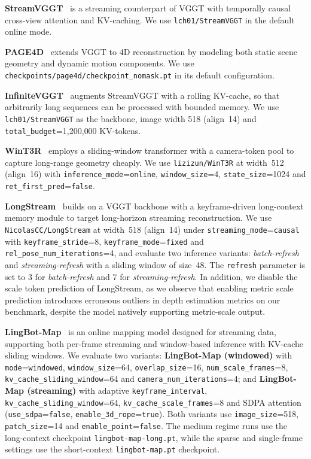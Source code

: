\textbf{StreamVGGT}~\citep{streamVGGT} is a streaming counterpart of VGGT with temporally causal cross-view attention and KV-caching.
%
We use \texttt{lch01/StreamVGGT} in the default online mode.

\textbf{PAGE4D}~\citep{zhou2025page4d} extends VGGT to 4D reconstruction by modeling both static scene geometry and dynamic motion components.
%
We use \texttt{checkpoints/page4d/checkpoint\_nomask.pt} in its default configuration.

\textbf{InfiniteVGGT}~\citep{yuan2026infinitevggt} augments StreamVGGT with a rolling KV-cache, so that arbitrarily long sequences can be processed with bounded memory.
%
We use \texttt{lch01/StreamVGGT} as the backbone, image width 518 (align~14) and \texttt{total\_budget}=1{,}200{,}000 KV-tokens.

\textbf{WinT3R}~\citep{li2025wint3r} employs a sliding-window transformer with a camera-token pool to capture long-range geometry cheaply.
%
We use \texttt{lizizun/WinT3R} at width~512 (align~16) with \texttt{inference\_mode}=\texttt{online}, \texttt{window\_size}=4, \texttt{state\_size}=1024 and \texttt{ret\_first\_pred}=\texttt{false}.

\textbf{LongStream}~\citep{cheng2026longstream} builds on a VGGT backbone with a keyframe-driven long-context memory module to target long-horizon streaming reconstruction.
%
We use \texttt{NicolasCC/LongStream} at width~518 (align~14) under \texttt{streaming\_mode}=\texttt{causal} with \texttt{keyframe\_stride}=8, \texttt{keyframe\_mode}=\texttt{fixed} and \texttt{rel\_pose\_num\_iterations}=4, and evaluate two inference variants: \emph{batch-refresh} and \emph{streaming-refresh} with a sliding window of size~48.
%
The \texttt{refresh} parameter is set to 3 for \emph{batch-refresh} and 7 for \emph{streaming-refresh}.
%
In addition, we disable the scale token prediction of LongStream, as we observe that enabling metric scale prediction introduces erroneous outliers in depth estimation metrics on our benchmark, despite the model natively supporting metric-scale output.


\textbf{LingBot-Map}~\citep{chen2026lingbotmap} is an online mapping model designed for streaming data, supporting both per-frame streaming and window-based inference with KV-cache sliding windows.
%
We evaluate two variants: \textbf{LingBot-Map (windowed)} with \texttt{mode}=\texttt{windowed}, \texttt{window\_size}=64, \texttt{overlap\_size}=16, \texttt{num\_scale\_frames}=8, \texttt{kv\_cache\_sliding\_window}=64 and \texttt{camera\_num\_iterations}=4; and \textbf{LingBot-Map (streaming)} with adaptive \texttt{keyframe\_interval}, \texttt{kv\_cache\_sliding\_window}=64, \texttt{kv\_cache\_scale\_frames}=8 and SDPA attention (\texttt{use\_sdpa}=\texttt{false}, \texttt{enable\_3d\_rope}=\texttt{true}). Both variants use \texttt{image\_size}=518, \texttt{patch\_size}=14 and \texttt{enable\_point}=\texttt{false}. The medium regime runs use the long-context checkpoint \texttt{lingbot-map-long.pt}, while the sparse and single-frame settings use the short-context \texttt{lingbot-map.pt} checkpoint.

